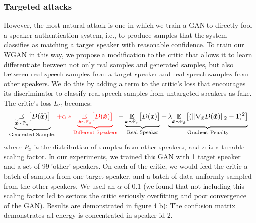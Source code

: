 \subsubsection{Targeted attacks}
However, the most natural attack is one in which we train a GAN to directly fool a speaker-authentication system, i.e., to produce samples that the system classifies as matching a target speaker with reasonable confidence. To train our WGAN in this way, we propose a modification to the critic that allows it to learn differentiate between not only real samples and generated samples, but also between real speech samples from a target speaker and real speech samples from other speakers. We do this by adding a term to the critic's loss that encourages its discriminator to classify real speech samples from untargeted speakers as fake. The critic's loss $L_C$ becomes:
\begin{align}
    \underbrace{\underset{\boldsymbol{\widetilde{x}} \sim \mathbb{P}_{g}}{\mathbb{E}}  \big[D(\boldsymbol{\widetilde{x}})\big]}_\text{Generated Samples} \color{red} + \alpha * \underbrace{\underset{\boldsymbol{\dot{x}} \sim \mathbb{P}_{\dot{x}}}{\mathbb{E}}  \big[D(\boldsymbol{\dot{x}})\big]}_\text{Different Speakers} \color{black} - \underbrace{\underset{\boldsymbol{x} \sim \mathbb{P}_{r}}{\mathbb{E}}  \big[D(\boldsymbol{x})\big]}_\text{Real Speaker}  + \underbrace{\lambda \underset{\boldsymbol{\hat{x}} \sim \mathbb{P}_{\hat{x}}}{\mathbb{E}}  \big[(\lVert \nabla_{\boldsymbol{\hat{x}}} D(\boldsymbol{\hat{x}}) \rVert_2 - 1)^2\big]}_\text{Gradient Penalty}
\end{align}
where $P_{\hat{x}}$ is the distribution of samples from other speakers, and $\alpha$ is a tunable scaling factor. In our experiments, we trained this GAN with 1 target speaker and a set of 99 'other' speakers. On each of the critic, we would feed the critic a batch of samples from one target speaker, and a batch of data uniformly sampled from the other speakers. We used an $\alpha$ of 0.1 (we found that not including this scaling factor led to serious the critic seriously overfitting and poor convergence of the GAN). Results are demonstrated in figure 4 b): The confusion  matrix demonstrates all energy is concentrated in speaker id 2. 
